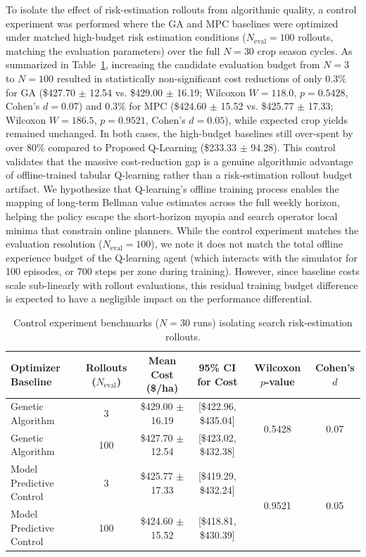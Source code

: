 \documentclass[review,3p,times,authoryear]{elsarticle}
\begin{document}
To isolate the effect of risk-estimation rollouts from algorithmic quality, a control experiment was performed where the GA and MPC baselines were optimized under matched high-budget risk estimation conditions ($N_{\text{eval}} = 100$ rollouts, matching the evaluation parameters) over the full $N = 30$ crop season cycles. As summarized in Table~\ref{tab:control_rollouts}, increasing the candidate evaluation budget from $N=3$ to $N=100$ resulted in statistically non-significant cost reductions of only 0.3\% for GA (\$427.70 $\pm$ 12.54 vs. \$429.00 $\pm$ 16.19; Wilcoxon $W = 118.0$, $p = 0.5428$, Cohen's $d = 0.07$) and 0.3\% for MPC (\$424.60 $\pm$ 15.52 vs. \$425.77 $\pm$ 17.33; Wilcoxon $W = 186.5$, $p = 0.9521$, Cohen's $d = 0.05$), while expected crop yields remained unchanged. In both cases, the high-budget baselines still over-spent by over 80\% compared to Proposed Q-Learning (\$233.33 $\pm$ 94.28). This control validates that the massive cost-reduction gap is a genuine algorithmic advantage of offline-trained tabular Q-learning rather than a risk-estimation rollout budget artifact. We hypothesize that Q-learning's offline training process enables the mapping of long-term Bellman value estimates across the full weekly horizon, helping the policy escape the short-horizon myopia and search operator local minima that constrain online planners. While the control experiment matches the evaluation resolution ($N_{\text{eval}} = 100$), we note it does not match the total offline experience budget of the Q-learning agent (which interacts with the simulator for 100 episodes, or 700 steps per zone during training). However, since baseline costs scale sub-linearly with rollout evaluations, this residual training budget difference is expected to have a negligible impact on the performance differential.

\begin{table}[H]
\centering
\caption{Control experiment benchmarks ($N=30$ runs) isolating search risk-estimation rollouts.}
\label{tab:control_rollouts}
\begin{tabular}{lccccc}
\toprule
Optimizer Baseline & Rollouts ($N_\text{eval}$) & Mean Cost (\$/ha) & 95\% CI for Cost & Wilcoxon $p$-value & Cohen's $d$ \\
\midrule
Genetic Algorithm & 3 & \$429.00 $\pm$ 16.19 & [\$422.96, \$435.04] & \multirow{2}{*}{0.5428} & \multirow{2}{*}{0.07} \\
Genetic Algorithm & 100 & \$427.70 $\pm$ 12.54 & [\$423.02, \$432.38] & & \\
\midrule
Model Predictive Control & 3 & \$425.77 $\pm$ 17.33 & [\$419.29, \$432.24] & \multirow{2}{*}{0.9521} & \multirow{2}{*}{0.05} \\
Model Predictive Control & 100 & \$424.60 $\pm$ 15.52 & [\$418.81, \$430.39] & & \\
\bottomrule
\end{tabular}
\end{table}
\end{document}
